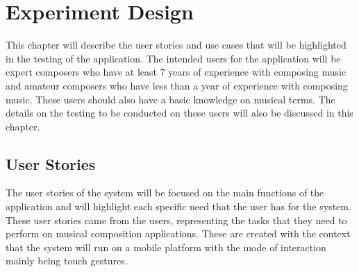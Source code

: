 \section{Experiment Design}

This chapter will describe the user stories and use cases that will be highlighted in the testing of the application. The intended users for the application will be expert composers who have at least 7 years of experience with composing music and amateur composers who have less than a year of experience with composing music. These users should also have a basic knowledge on musical terms. The details on the testing to be conducted on these users will also be discussed in this chapter.

\subsection{User Stories}
The user stories of the system will be focused on the main functions of the application and will highlight each specific need that the user has for the system. These user stories came from the users, representing the tasks that they need to perform on musical composition applications. These are created with the context that the system will run on a mobile platform with the mode of interaction mainly being touch gestures. 


